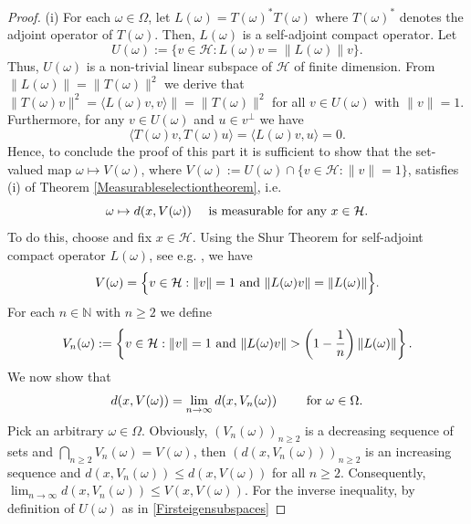 \documentclass[pdflatex,sn-mathphys-num]{sn-jnl}%
\theoremstyle{thmstyleone}%
\theoremstyle{thmstyletwo}%
\theoremstyle{thmstylethree}%
\newcommand{\N}{\mathbb{N}}
\newcommand{\cH}{\mathcal{H}}
\numberwithin{equation}{section}
\begin{document}
\begin{proof}
(i) For each $\omega\in\Omega$, let $L(\omega)=T(\omega)^* T(\omega)$ where $T(\omega)^*$ denotes the adjoint operator of $T(\omega)$. Then, $L(\omega)$ is a self-adjoint compact operator. Let
\begin{equation}\label{Firsteigensubspaces}
U(\omega):=\Big\{v\in\cH:L(\omega)v  =\|L(\omega)\|v\Big\}.
\end{equation}
Thus, $U(\omega)$ is a non-trivial linear subspace of $\cH$ of finite dimension. From $\|L(\omega)\|=\|T(\omega)\|^2$ we derive that $\|T(\omega)v\|^2= \langle L(\omega)v,v\rangle\|=\|T(\omega)\|^2$ for all $v\in U(\omega)$ with $\|v\|=1$. Furthermore, for any $v\in U(\omega)$ and $u\in v^{\perp}$ we have 
\[
\langle T(\omega) v, T(\omega) u\rangle
=
\langle L(\omega) v,  u\rangle=0.
\]
Hence, to conclude the proof of this part it is sufficient to show that the set-valued map $\omega\mapsto V(\omega)$, where  $V(\omega):=U(\omega)\cap \{v\in\cH:\|v\|=1\}$, satisfies (i) of Theorem \ref{Measurableselectiontheorem}, i.e. 
\begin{equation}\label{Aim1}
\omega\mapsto d(x,V(\omega))\quad \hbox{ is measurable for any } x\in\cH.   
\end{equation}
To do this, choose and fix $x\in\cH$. Using the Shur Theorem for self-adjoint compact operator $L(\omega)$, see e.g. \cite[Theorem VII.4]{Retherford}, we have 
\begin{equation}\label{Measurability_Eq01}
V(\omega)=\Big\{v\in\cH: \|v\|=1 \hbox{ and } \|L(\omega) v\|=\|L(\omega)\|\Big\}.    
\end{equation}
For each $n\in\N$ with $n\geq 2$ we define 
\begin{equation}\label{Approximatesubspaces}
V_n(\omega):=\left\{v\in\cH: \|v\|=1 \hbox{ and } \|L(\omega)v\|>\left(1-\frac{1}{n}\right) \|L(\omega)\|\right\}.
\end{equation}
We now show that 
\begin{equation}\label{Approximatedsequence}
d(x,V(\omega))=\lim_{n\to\infty} d(x,V_n(\omega))\qquad \hbox{ for } \omega\in\Omega.
\end{equation}
Pick an arbitrary $\omega\in\Omega$. Obviously, $(V_n(\omega))_{n\geq 2}$ is a decreasing sequence of sets and $\bigcap_{n\geq 2} V_n(\omega)=V(\omega)$, then $(d(x,V_n(\omega)))_{n\geq 2}$ is an increasing sequence and $d(x,V_n(\omega))\leq d(x,V(\omega))$ for all $n\geq 2$. Consequently, $\lim_{n\to\infty} d(x,V_n(\omega))\leq V(x,V(\omega))$. For the inverse inequality, by definition of $U(\omega)$ as in \eqref{Firsteigensubspaces}

\end{proof}
\end{document}
